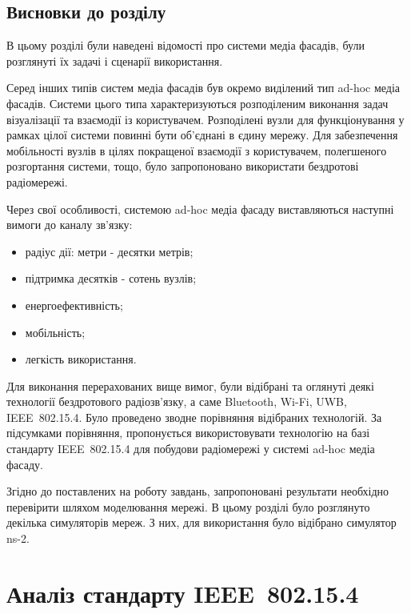 \documentclass[a4paper,ukrainian,utf8,nocolumnsxix,floatsection,equationsection]{eskdtext}
\let\stdsection\section
\renewcommand\section{\clearpage\stdsection}
\newcommand{\todoi}[1]{\todo[inline]{#1}}
\newcommand{\iee}[0]{IEEE~802.15.4\xspace}
\begin{document}


\subsection{Висновки до розділу}

В цьому розділі були наведені відомості про системи медіа фасадів, були розглянуті їх задачі і сценарії використання. 

Серед інших типів систем медіа фасадів був окремо виділений тип ad-hoc медіа фасадів. Системи цього типа характеризуються розподіленим виконання задач візуалізації та взаємодії із користувачем. Розподілені вузли для функціонування у рамках цілої системи повинні бути об’єднані в єдину мережу. Для забезпечення мобільності вузлів в цілях покращеної взаємодії з користувачем, полегшеного розгортання системи, тощо, було запропоновано використати бездротові радіомережі.

Через свої особливості, системою ad-hoc медіа фасаду виставляються наступні вимоги до каналу зв’язку:
\begin{itemize}
	\item радіус дії: метри - десятки метрів;
	\item підтримка десятків - сотень вузлів;
	\item енергоефективність;
	\item мобільність;
	\item легкість використання.
\end{itemize}

Для виконання перерахованих вище вимог, були відібрані та оглянуті деякі технології бездротового радіозв’язку, а саме Bluetooth, Wi-Fi, UWB, \iee. Було проведено зводне порівняння відібраних технологій. За підсумками порівняння, пропонується використовувати технологію на базі стандарту \iee для побудови радіомережі у системі ad-hoc медіа фасаду. 

Згідно до поставлених на роботу завдань, запропоновані результати необхідно перевірити шляхом моделювання мережі. В цьому розділі було розглянуто декілька симуляторів мереж. З них, для використання було відібрано симулятор ns-2.



\section{Аналіз стандарту \iee}
\label{sec:ieee:standard:analysis}
\end{document}
